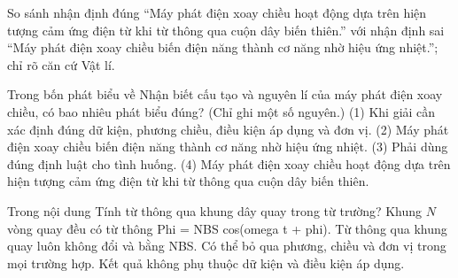 \begin{bt}
So sánh nhận định đúng “Máy phát điện xoay chiều hoạt động dựa trên hiện tượng cảm ứng điện từ khi từ thông qua cuộn dây biến thiên.” với nhận định sai “Máy phát điện xoay chiều biến điện năng thành cơ năng nhờ hiệu ứng nhiệt.”; chỉ rõ căn cứ Vật lí.
\end{bt}

\begin{ex}
Trong bốn phát biểu về Nhận biết cấu tạo và nguyên lí của máy phát điện xoay chiều, có bao nhiêu phát biểu đúng? (Chỉ ghi một số nguyên.) (1) Khi giải cần xác định đúng dữ kiện, phương chiều, điều kiện áp dụng và đơn vị. (2) Máy phát điện xoay chiều biến điện năng thành cơ năng nhờ hiệu ứng nhiệt. (3) Phải dùng đúng định luật cho tình huống. (4) Máy phát điện xoay chiều hoạt động dựa trên hiện tượng cảm ứng điện từ khi từ thông qua cuộn dây biến thiên.
\end{ex}

\begin{ex}
Trong nội dung Tính từ thông qua khung dây quay trong từ trường?
\choice
{\True Khung $N$ vòng quay đều có từ thông Phi = NBS cos(omega t + phi).}
{Từ thông qua khung quay luôn không đổi và bằng NBS.}
{Có thể bỏ qua phương, chiều và đơn vị trong mọi trường hợp.}
{Kết quả không phụ thuộc dữ kiện và điều kiện áp dụng.}
\end{ex}

